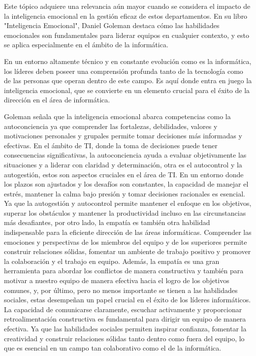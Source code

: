 \documentclass[journal]{IEEEtran}
\begin{document}
Este tópico adquiere una relevancia aún mayor cuando se considera el impacto de la inteligencia emocional en la gestión eficaz de estos departamentos. En su libro "Inteligencia Emocional", Daniel Goleman destaca cómo las habilidades emocionales son fundamentales para liderar equipos en cualquier contexto, y esto se aplica especialmente en el ámbito de la informática.

En un entorno altamente técnico y en constante evolución como es la informática, los líderes deben poseer una comprensión profunda tanto de la tecnología como de las personas que operan dentro de este campo. Es aquí donde entra en juego la inteligencia emocional, que se convierte en un elemento crucial para el éxito de la dirección en el área de informática.

Goleman señala que la inteligencia emocional abarca competencias como la autoconciencia ya que comprender las fortalezas, debilidades, valores y motivaciones personales y grupales permite tomar decisiones más informadas y efectivas. En el ámbito de TI, donde la toma de decisiones puede tener consecuencias significativas, la autoconciencia ayuda a evaluar objetivamente las situaciones y a liderar con claridad y determinación, otra es el autocontrol y la autogestión, estos son aspectos cruciales en el área de TI. En un entorno donde los plazos son ajustados y los desafíos son constantes, la capacidad de manejar el estrés, mantener la calma bajo presión y tomar decisiones racionales es esencial. Ya que la autogestión y autocontrol permite mantener el enfoque en los objetivos, superar los obstáculos y mantener la productividad incluso en las circunstancias más desafiantes, por otro lado, la empatía es también otra habilidad indispensable para la eficiente dirección de las áreas informáticas. Comprender las emociones y perspectivas de los miembros del equipo y de los superiores permite construir relaciones sólidas, fomentar un ambiente de trabajo positivo y promover la colaboración y el trabajo en equipo. Además, la empatía es una gran herramienta para abordar los conflictos de manera constructiva y también para motivar a nuestro equipo de manera efectiva hacia el logro de los objetivos comunes, y, por último, pero no menos importante se tienen a las habilidades sociales, estas desempeñan un papel crucial en el éxito de los líderes informáticos. La capacidad de comunicarse claramente, escuchar activamente y proporcionar retroalimentación constructiva es fundamental para dirigir un equipo de manera efectiva. Ya que las habilidades sociales permiten inspirar confianza, fomentar la creatividad y construir relaciones sólidas tanto dentro como fuera del equipo, lo que es esencial en un campo tan colaborativo como el de la informática.
\end{document}
